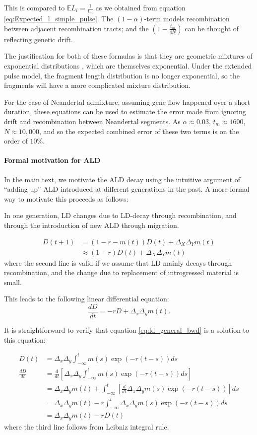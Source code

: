 \documentclass[11pt]{article}
\let\oldparagraph\paragraph
\renewcommand{\paragraph}[1]{\oldparagraph{#1}\mbox{}}
\begin{document}
This is compared to $\mathbb{E}L_i = \frac{1}{t_m}$ as we obtained from equation \ref{eq:Expected_l_simple_pulse}.
The $(1-\alpha)$-term models recombination between adjacent recombination tracts; and the $\left(1-\frac{t_m}{4N}\right)$ can be thought of reflecting genetic drift. 

The justification for both of these formulas is that they are geometric mixtures of exponential distributions \cite{liang_lengths_2014}, which are themselves exponential. Under the extended pulse model, the fragment length distribution is no longer exponential, so the fragments will have a more complicated mixture distribution. 

For the case of Neandertal admixture, assuming gene flow happened over a short duration, these equations can be used to estimate the error made from ignoring drift and recombination between Neandertal segments. As $\alpha \approx 0.03$, $t_m \approx 1600$, $N \approx 10,000$, and so the expected combined error of these two terms is on the order of $10\%$.
\paragraph{Formal motivation for ALD}
In the main text, we motivate the ALD decay using the intuitive argument of ``adding up'' ALD introduced at different generations in the past. A more formal way to motivate this proceeds as follows:

In one generation, LD changes due to LD-decay through recombination, and through the introduction of new ALD through migration.

\begin{align}
    D(t+1) &= (1-r-m(t)) D(t) + \Delta_X \Delta_Y m(t)\nonumber\\
    &\approx (1-r) D(t) + \Delta_X \Delta_Y m(t)
\end{align}
where the second line is valid if we assume that LD mainly decays through recombination, and the change due to replacement of introgressed material is small.

This leads to the following linear differential equation:
\begin{equation}
    \frac{dD}{dt} = -r D + \Delta_x\Delta_y m(t)\text{.}
\end{equation}

It is straightforward to verify that equation \ref{eq:ld_general_bwd} is a solution to this equation:

\begin{align}
   D(t) &= \Delta_x\Delta_y\int_{-\infty}^t m(s)\exp(-r(t-s)) ds \nonumber \\
   \frac{d D}{dt} &= \frac{d}{dt}\left[ \Delta_x\Delta_y\int_{-\infty}^t m(s)\exp(-r(t-s)) ds \right]\nonumber\\
   &= \Delta_x\Delta_y m(t) + \int_{-\infty}^t \left[\frac{d}{dt}\Delta_x\Delta_y m(s)\exp(-r(t-s))\right]ds \nonumber\\
   &= \Delta_x\Delta_y m(t) - r \int_{-\infty}^t \Delta_x\Delta_y m(s)\exp(-r(t-s))ds \nonumber\\
   &= \Delta_x\Delta_y m(t) -r D(t)   
\end{align}
where the third line follows from Leibniz integral rule.
\end{document}
